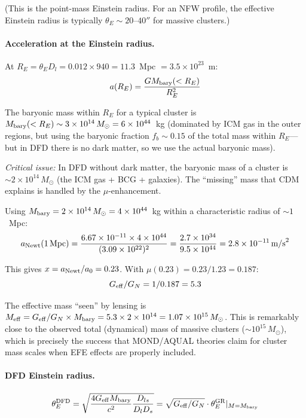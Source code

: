 \documentclass[11pt,a4paper]{article}
\newcommand{\Geff}{G_{\rm eff}}
\newcommand{\ee}[1]{\times 10^{#1}}
\begin{document}
(This is the point-mass Einstein radius.  For an NFW profile, the
effective Einstein radius is typically $\theta_E \sim 20$--$40''$ for
massive clusters.)

\paragraph{Acceleration at the Einstein radius.}
At $R_E = \theta_E D_l = 0.012 \times 940 = 11.3$~Mpc $= 3.5\ee{23}$~m:
\begin{equation}
a(R_E) = \frac{GM_{\rm bary}(<R_E)}{R_E^2}
\end{equation}

The baryonic mass within $R_E$ for a typical cluster is
$M_{\rm bary}(<R_E) \sim 3\ee{14}\,M_\odot = 6\ee{44}$~kg
(dominated by ICM gas in the outer regions, but using the baryonic
fraction $f_b \sim 0.15$ of the total mass within $R_E$---but in DFD
there is no dark matter, so we use the actual baryonic mass).

\emph{Critical issue:} In DFD without dark matter, the baryonic mass
of a cluster is $\sim 2\ee{14}\,M_\odot$ (the ICM gas + BCG + galaxies).
The ``missing'' mass that CDM explains is handled by the $\mu$-enhancement.

Using $M_{\rm bary} = 2\ee{14}\,M_\odot = 4\ee{44}$~kg within a
characteristic radius of $\sim 1$~Mpc:
\begin{equation}
a_{\rm Newt}(1\,\text{Mpc}) = \frac{6.67\ee{-11} \times 4\ee{44}}{(3.09\ee{22})^2}
= \frac{2.7\ee{34}}{9.5\ee{44}} = 2.8\ee{-11}\,\text{m/s}^2
\end{equation}

This gives $x = a_{\rm Newt}/a_0 = 0.23$.  With $\mu(0.23) = 0.23/1.23
= 0.187$:
\begin{equation}
\Geff/G_N = 1/0.187 = 5.3
\end{equation}

The effective mass ``seen'' by lensing is $M_{\rm eff} = \Geff/G_N
\times M_{\rm bary} = 5.3 \times 2\ee{14} = 1.07\ee{15}\,M_\odot$.
This is remarkably close to the observed total (dynamical) mass of
massive clusters ($\sim 10^{15}\,M_\odot$), which is precisely the
success that MOND/AQUAL theories claim for cluster mass scales when EFE
effects are properly included.

\paragraph{DFD Einstein radius.}
\begin{equation}
\theta_E^{\rm DFD} = \sqrt{\frac{4\Geff M_{\rm bary}}{c^2}\frac{D_{ls}}{D_l D_s}}
= \sqrt{\Geff/G_N} \cdot \theta_E^{\rm GR}|_{M=M_{\rm bary}}
\end{equation}
\end{document}
